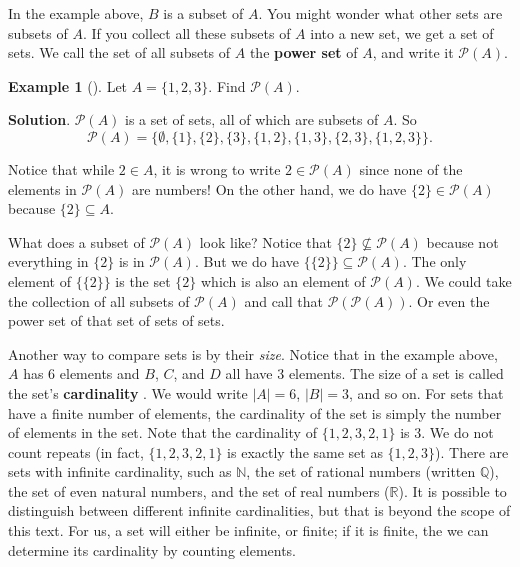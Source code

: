 \documentclass[10pt,]{book}
\newcommand{\terminology}[1]{\textbf{#1}}
\theoremstyle{plain}
\theoremstyle{definition}
\theoremstyle{definition}
\newtheorem{example}[theorem]{Example}
\theoremstyle{definition}
\theoremstyle{definition}
\numberwithin{equation}{chapter}
\def\N{\mathbb N}
\def\pow{\mathcal P}
\begin{document}
\hypertarget{p-1603}{}%
In the example above, \(B\) is a subset of \(A\). You might wonder what other sets are subsets of \(A\). If you collect all these subsets of \(A\) into a new set, we get a set of sets. We call the set of all subsets of \(A\) the \terminology{power set}  of \(A\), and write it \(\pow(A)\).%
\begin{example}[]\label{example-41}
\hypertarget{p-1604}{}%
Let \(A = \{1,2,3\}\). Find \(\pow(A)\).%
\par\smallskip%
\noindent\textbf{Solution}.\hypertarget{solution-132}{}\quad%
\hypertarget{p-1605}{}%
\(\pow(A)\) is a set of sets, all of which are subsets of \(A\). So%
\begin{equation*}
\pow(A) = \{ \emptyset, \{1\}, \{2\}, \{3\}, \{1,2\}, \{1, 3\}, \{2,3\}, \{1,2,3\}\}.
\end{equation*}
%
\par
\hypertarget{p-1606}{}%
Notice that while \(2 \in A\), it is wrong to write \(2 \in \pow(A)\) since none of the elements in \(\pow(A)\) are numbers! On the other hand, we do have \(\{2\} \in \pow(A)\) because \(\{2\} \subseteq A\).%
\par
\hypertarget{p-1607}{}%
What does a subset of \(\pow(A)\) look like? Notice that \(\{2\} \not\subseteq \pow(A)\) because not everything in \(\{2\}\) is in \(\pow(A)\). But we do have \(\{ \{2\} \} \subseteq \pow(A)\). The only element of \(\{\{2\}\}\) is the set \(\{2\}\) which is also an element of \(\pow(A)\). We could take the collection of all subsets of \(\pow(A)\) and call that \(\pow(\pow(A))\). Or even the power set of that set of sets of sets.%
\end{example}
\hypertarget{p-1608}{}%
Another way to compare sets is by their \emph{size}. Notice that in the example above, \(A\) has 6 elements and \(B\), \(C\), and \(D\) all have 3 elements. The size of a set is called the set's \terminology{cardinality} . We would write \(|A| = 6\), \(|B| = 3\), and so on. For sets that have a finite number of elements, the cardinality of the set is simply the number of elements in the set. Note that the cardinality of \(\{ 1, 2, 3, 2, 1\}\) is 3. We do not count repeats (in fact, \(\{1, 2, 3, 2, 1\}\) is exactly the same set as \(\{1, 2, 3\}\)). There are sets with infinite cardinality, such as \(\N\), the set of rational numbers (written \(\mathbb Q\)), the set of even natural numbers, and the set of real numbers (\(\mathbb R\)). It is possible to distinguish between different infinite cardinalities, but that is beyond the scope of this text. For us, a set will either be infinite, or finite; if it is finite, the we can determine its cardinality by counting elements.%
\end{document}
